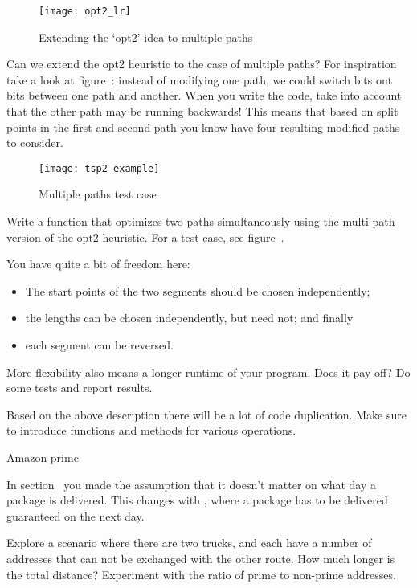 \begin{figure}[ht]
  \texttt{[image: opt2\_lr]}
  \caption{Extending the `opt2' idea to multiple paths}
  \label{fig:opt2_lr}
\end{figure}

Can we extend the opt2 heuristic to the case of multiple paths?
For inspiration take a look at figure~: instead of
modifying one path, we could switch bits out bits between one path and another.
When you write the code, take into account that the other path may be
running backwards! This means that based on split points in the first
and second path you know have four resulting modified paths to
consider.

\begin{figure}[ht]
  \texttt{[image: tsp2-example]}
  \caption{Multiple paths test case}
  \label{fig:tsp2-example}
\end{figure}

\begin{exercise}
  Write a function that optimizes two paths simultaneously using the
  multi-path version of the opt2 heuristic. For a test case, see
  figure~.

  You have quite a bit of freedom here:
  \begin{itemize}
  \item The start points of the two segments should be chosen independently;
  \item the lengths can be chosen independently, but need not; and finally
  \item each segment can be reversed.
  \end{itemize}
  More flexibility also means a longer runtime of your program.
  Does it pay off? Do some tests and report results.
\end{exercise}

Based on the above description there will be a lot of code
duplication. Make sure to introduce functions and methods for various
operations.

 {Amazon prime}

In section~ you made the assumption that it
doesn't matter on what day a package is delivered. This changes with
, where a package has to be delivered
guaranteed on the next day.

\begin{exercise}
  Explore a scenario where there are two trucks, and each have a number
  of addresses that can not be exchanged with the other route.
  How much longer is the total distance? Experiment with
  the ratio of prime to non-prime addresses.
\end{exercise}

